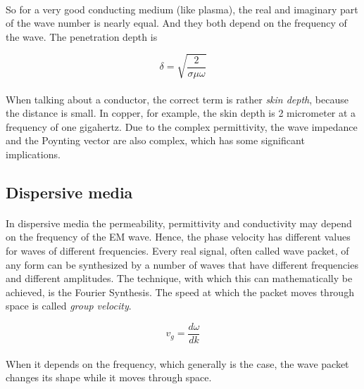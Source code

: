 \documentclass[a4paper,10pt]{thesis}
\begin{document}
\paragraph*{}
So for a very good conducting medium (like plasma), the real and imaginary part of the wave number is nearly equal. And they both depend on the frequency of the wave. The penetration depth is

\begin{equation}\label{skin depth_conductor}
    \delta=\sqrt{\frac{2}{ \sigma \mu \omega }}
\end{equation}

\paragraph*{}
When talking about a conductor, the correct term is rather \emph{skin depth}, because the distance is small. In copper, for example, the skin depth is 2 micrometer at a frequency of one gigahertz. Due to the complex permittivity, the wave impedance and the Poynting vector are also complex, which has some significant implications.

\subsection{Dispersive media}
\paragraph*{}
In dispersive media the permeability, permittivity and conductivity may depend on the frequency of the EM wave. Hence, the phase velocity has different values for waves of different frequencies. Every real signal, often called wave packet, of any form can be synthesized by a number of waves that have different frequencies and different amplitudes. The technique, with which this can mathematically be achieved, is the Fourier Synthesis. The speed at which the packet moves through space is called \emph{group velocity}.

\begin{equation}\label{group_velocity}
    v_g=\frac{d \omega}{dk}
\end{equation}

\paragraph*{}
When it depends on the frequency, which generally is the case, the wave packet changes its shape while it moves through space.
\end{document}
